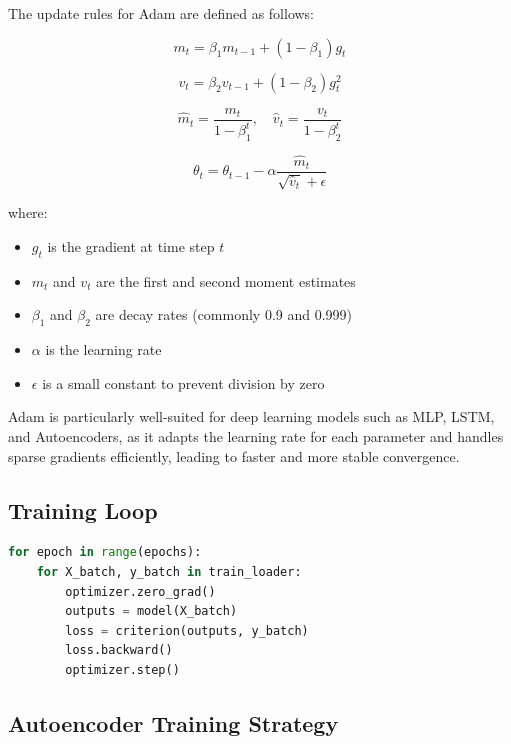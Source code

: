 \documentclass{ecsproject}     %
\begin{document}
The update rules for Adam are defined as follows:

\begin{equation}
m_t = \beta_1 m_{t-1} + (1 - \beta_1) g_t
\end{equation}

\begin{equation}
v_t = \beta_2 v_{t-1} + (1 - \beta_2) g_t^2
\end{equation}

\begin{equation}
\hat{m}_t = \frac{m_t}{1 - \beta_1^t}, \quad
\hat{v}_t = \frac{v_t}{1 - \beta_2^t}
\end{equation}

\begin{equation}
\theta_t = \theta_{t-1} - \alpha \frac{\hat{m}_t}{\sqrt{\hat{v}_t} + \epsilon}
\end{equation}

where:
\begin{itemize}
    \item $g_t$ is the gradient at time step $t$
    \item $m_t$ and $v_t$ are the first and second moment estimates
    \item $\beta_1$ and $\beta_2$ are decay rates (commonly 0.9 and 0.999)
    \item $\alpha$ is the learning rate
    \item $\epsilon$ is a small constant to prevent division by zero
\end{itemize}

Adam is particularly well-suited for deep learning models such as MLP, LSTM, and Autoencoders, as it adapts the learning rate for each parameter and handles sparse gradients efficiently, leading to faster and more stable convergence.

\subsection{Training Loop}
\begin{lstlisting}[language=Python, caption=Training Loop]
for epoch in range(epochs):
    for X_batch, y_batch in train_loader:
        optimizer.zero_grad()
        outputs = model(X_batch)
        loss = criterion(outputs, y_batch)
        loss.backward()
        optimizer.step()
\end{lstlisting}

\subsection{Autoencoder Training Strategy}
\end{document}
